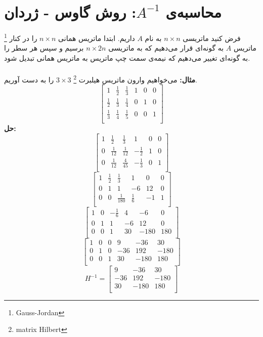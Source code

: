 \section{محاسبه‌ی $A^{-1}$: روش گاوس - ژردان} \footnote{Gauss-Jordan}
فرض کنید ماتریسی $n\times n$ به نام $A$ داریم. ابتدا ماتریس همانی $n\times n$ را در کنار ماتریس $A$ به گونه‌ای قرار می‌دهیم که به ماتریسی $n\times 2n$ برسیم و سپس هر سطر را به گونه‌ای تغییر می‌دهیم که نیمه‌ی سمت چپ ماتریس به ماتریس همانی تبدیل شود.\\\\
\textbf{مثال:}
می‌خواهیم وارون ماتریس هیلبرت \footnote{matrix Hilbert} $3\times3$ را به دست آوریم.\\
\[\begin{bmatrix}
1&\frac{1}{2}&\frac{1}{3}&1&0&0\\
\frac{1}{2}&\frac{1}{3}&\frac{1}{4}&0&1&0\\
\frac{1}{3}&\frac{1}{4}&\frac{1}{5}&0&0&1\\
\end{bmatrix}\]
\textbf{حل:}
\[\begin{bmatrix}
1&\frac{1}{2}&\frac{1}{3}&1&0&0\\
0&\frac{1}{12}&\frac{1}{12}&-\frac{1}{2}&1&0\\
0&\frac{1}{12}&\frac{4}{45}&-\frac{1}{3}&0&1\\
\end{bmatrix}\]
\[\begin{bmatrix}
1&\frac{1}{2}&\frac{1}{3}&1&0&0\\
0&1&1&-6&12&0\\
0&0&\frac{1}{180}&\frac{1}{6}&-1&1\\
\end{bmatrix}\]
\[\begin{bmatrix}
1&0&-\frac{1}{6}&4&-6&0\\
0&1&1&-6&12&0\\
0&0&1&30&-180&180\\
\end{bmatrix}\]
\[\begin{bmatrix}
1&0&0&9&-36&30\\
0&1&0&-36&192&-180\\
0&0&1&30&-180&180\\
\end{bmatrix}\]
\[H^{-1} = \begin{bmatrix}
9&-36&30\\
-36&192&-180\\
30&-180&180\\
\end{bmatrix}\]
